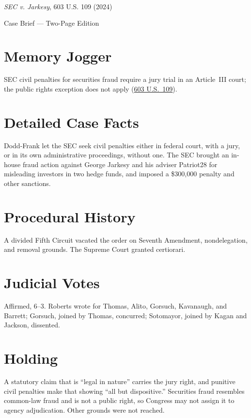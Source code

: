 \documentclass[12pt]{article}
\begin{document}
\begin{center}
{\LARGE \textit{SEC v. Jarkesy}, 603 U.S. 109 (2024)\par}
\vspace{0.5em}
{\large Case Brief --- Two-Page Edition\par}
\end{center}

\section{Memory Jogger}
SEC civil penalties for securities fraud require a jury trial in an Article~III court; the public rights exception does not apply (\href{https://supreme.justia.com/cases/federal/us/603/22-859/}{603 U.S.\ 109}).

\section{Detailed Case Facts}
Dodd-Frank let the SEC seek civil penalties either in federal court, with a jury, or in its own administrative proceedings, without one. The SEC brought an in-house fraud action against George Jarkesy and his adviser Patriot28 for misleading investors in two hedge funds, and imposed a \$300,000 penalty and other sanctions.

\section{Procedural History}
A divided Fifth Circuit vacated the order on Seventh Amendment, nondelegation, and removal grounds. The Supreme Court granted certiorari.

\section{Judicial Votes}
Affirmed, 6--3. Roberts wrote for Thomas, Alito, Gorsuch, Kavanaugh, and Barrett; Gorsuch, joined by Thomas, concurred; Sotomayor, joined by Kagan and Jackson, dissented.

\section{Holding}
A statutory claim that is ``legal in nature'' carries the jury right, and punitive civil penalties make that showing ``all but dispositive.'' Securities fraud resembles common-law fraud and is not a public right, so Congress may not assign it to agency adjudication. Other grounds were not reached.
\end{document}
